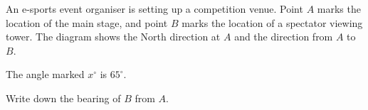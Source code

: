 \begin{question}
\noindent An e-sports event organiser is setting up a competition venue. Point $A$ marks the location of the main stage, and point $B$ marks the location of a spectator viewing tower. The diagram shows the North direction at $A$ and the direction from $A$ to $B$.

\begin{center}
\end{center}

\noindent The angle marked $x^\circ$ is $65^\circ$.

\noindent Write down the bearing of $B$ from $A$.

\vspace{4cm}

\begin{flushright}
\end{flushright}
\end{question}
